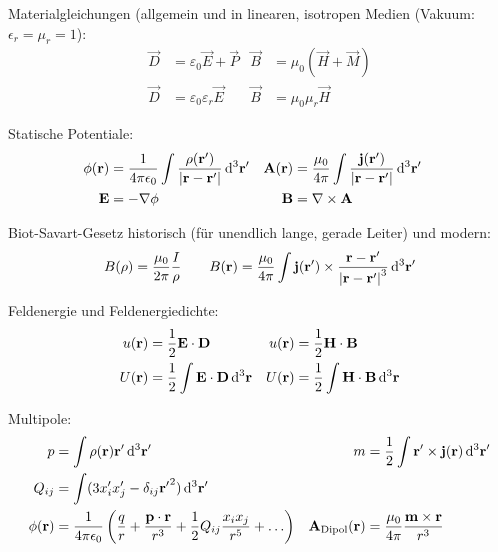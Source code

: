 Materialgleichungen (allgemein und in linearen, isotropen Medien (Vakuum: $\epsilon_r=\mu_r=1$):
\begin{align*}
	\vec {D} & =\varepsilon _{0}\vec {E}+\vec {P}        & \vec {B} & =\mu _{0}\left(\vec {H}+\vec {M}\right) \\
	\vec {D} & =\varepsilon _{0}\varepsilon _{r}\vec {E} & \vec {B} & =\mu _{0}\mu _{r}\vec {H}
\end{align*}

Statische Potentiale:
\begin{align*}
	\phi(\vec r)   & =\frac{1}{4\pi\epsilon_0}\int \frac{\rho(\vec r')}{\left|\vec r-\vec r'\right|}\diffa[3]{\vec r'} &
	\vec A(\vec r) & =\frac{\mu_0}{4\pi}\int \frac{\vec j(\vec r')}{\left|\vec r-\vec r'\right|}\diffa[3]{\vec r'}       \\
	\vec E         & =-\nabla \phi                                                                                     &
	\vec B         & =\nabla \times\vec A                                                                              &
\end{align*}

Biot-Savart-Gesetz historisch (für unendlich lange, gerade Leiter) und modern:
\begin{align*}
	B(\rho) = \frac{\mu_0}{2\pi}\frac{I}{\rho} \qquad B(\vec r)=\frac{\mu_0}{4\pi}\int\vec j(\vec r')\times \frac{\vec r-\vec r'}{\left|\vec r-\vec r'\right|^3}\diffa[3]{\vec r'}
\end{align*}

Feldenergie und Feldenergiedichte:
\begin{align*}
	u(\vec r) & =\frac{1}{2}\vec E\cdot \vec D                      & u(\vec r) & =\frac{1}{2}\vec H\cdot \vec B                       \\
	U(\vec r) & =\frac{1}{2}\int\vec E\cdot \vec D\diffa[3]{\vec r} & U(\vec r) & =\frac{1}{2}\int\vec H\cdot \vec B \diffa[3]{\vec r}
\end{align*}


Multipole:
\begin{align*}
	p            & = \int\rho(\vec r)\vec r'\diffa[3]{\vec r'}                                                                                   & m                            & =\frac{1}{2}\int \vec r'\times\vec j(\vec r)	\diffa[3]{\vec r'} \\
	Q_{ij}       & =\int (3x_i'x_j'-\delta_{ij} {\vec r'}^2)\diffa[3]{\vec r'}                                                                   &                              &                                                                \\
	\phi(\vec r) & = \frac{1}{4\pi\epsilon_0}\left(\frac{q}{r}+\frac{\vec p\cdot \vec r}{r^3}+\frac{1}{2}Q_{ij} \frac{x_ix_j}{r^5}+\ldots\right) & \vec A_\text{Dipol} (\vec r) & =\frac{\mu_0}{4\pi} \frac{\vec m\times \vec r}{r^3}
\end{align*}


